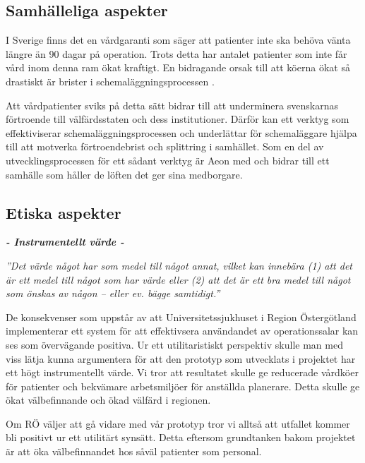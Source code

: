 \subsection{Samhälleliga aspekter}

I Sverige finns det en vårdgaranti som säger att patienter inte ska behöva vänta längre än 90 dagar på operation. Trots detta har antalet patienter som inte får vård inom denna ram ökat kraftigt. En bidragande orsak till att köerna ökat så drastiskt är brister i schemaläggningsprocessen \cite{vardko}.

Att vårdpatienter sviks på detta sätt bidrar till att underminera svenskarnas förtroende till välfärdsstaten och dess institutioner. Därför kan ett verktyg som effektiviserar schemaläggningsprocessen och underlättar för schemaläggare hjälpa till att motverka förtroendebrist och splittring i samhället. Som en del av utvecklingsprocessen för ett sådant verktyg är Aeon med och bidrar till ett samhälle som håller de löften det ger sina medborgare.

\subsection{Etiska aspekter}
\vspace{1em}
\begin{minipage}{1\linewidth}
\begin{center}
\textbf{\textit{- Instrumentellt värde -}}

\emph{''Det värde något har som medel till något annat, vilket kan innebära (1) att det är ett medel till något som har värde eller (2) att det är ett bra medel till något som önskas av någon – eller ev. bägge samtidigt.''} \cite{ne}

\end{center}
\end{minipage}

De konsekvenser som uppstår av att Universitetssjukhuset i Region Östergötland implementerar ett system för att effektivsera användandet av operationssalar kan ses som övervägande positiva. Ur ett utilitaristiskt perspektiv skulle man med viss lätja kunna argumentera för att den prototyp som utvecklats i projektet har ett högt instrumentellt värde. Vi tror att resultatet skulle ge reducerade vårdköer för patienter och bekvämare arbetsmiljöer för anställda planerare. Detta skulle ge ökat välbefinnande och ökad välfärd i regionen.

Om RÖ väljer att gå vidare med vår prototyp tror vi alltså att utfallet kommer bli positivt ur ett utilitärt synsätt. Detta eftersom grundtanken bakom projektet är att öka välbefinnandet hos såväl patienter som personal.

